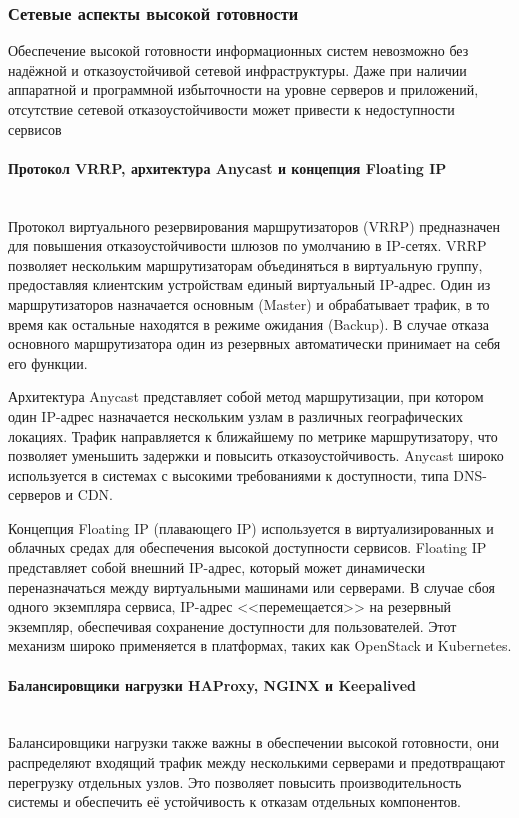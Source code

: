 \subsubsection{Сетевые аспекты высокой готовности}

Обеспечение высокой готовности информационных систем невозможно без надёжной и отказоустойчивой сетевой инфраструктуры. Даже при наличии аппаратной и программной избыточности на уровне серверов и приложений, отсутствие сетевой отказоустойчивости может привести к недоступности сервисов \autocite{NginxDocs1}

\paragraph{Протокол VRRP, архитектура Anycast и концепция Floating IP} ~\\
Протокол виртуального резервирования маршрутизаторов (VRRP) предназначен для повышения отказоустойчивости шлюзов по умолчанию в IP-сетях. VRRP позволяет нескольким маршрутизаторам объединяться в виртуальную группу, предоставляя клиентским устройствам единый виртуальный IP-адрес. Один из маршрутизаторов назначается основным (Master) и обрабатывает трафик, в то время как остальные находятся в режиме ожидания (Backup). В случае отказа основного маршрутизатора один из резервных автоматически принимает на себя его функции.

Архитектура Anycast представляет собой метод маршрутизации, при котором один IP-адрес назначается нескольким узлам в различных географических локациях. Трафик направляется к ближайшему по метрике маршрутизатору, что позволяет уменьшить задержки и повысить отказоустойчивость. Anycast широко используется в системах с высокими требованиями к доступности, типа DNS-серверов и CDN.

Концепция Floating IP (плавающего IP) используется в виртуализированных и облачных средах для обеспечения высокой доступности сервисов. Floating IP представляет собой внешний IP-адрес, который может динамически переназначаться между виртуальными машинами или серверами. В случае сбоя одного экземпляра сервиса, IP-адрес <<перемещается>> на резервный экземпляр, обеспечивая сохранение доступности для пользователей. Этот механизм широко применяется в платформах, таких как OpenStack и Kubernetes.

\paragraph{Балансировщики нагрузки HAProxy, NGINX и Keepalived} ~\\
Балансировщики нагрузки также важны в обеспечении высокой готовности, они распределяют входящий трафик между несколькими серверами и предотвращают перегрузку отдельных узлов. Это позволяет повысить производительность системы и обеспечить её устойчивость к отказам отдельных компонентов.

